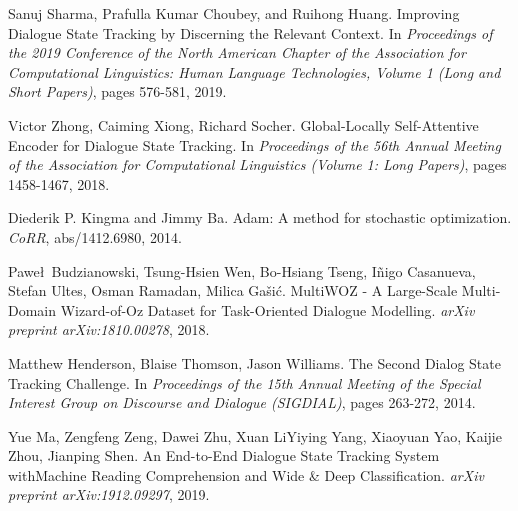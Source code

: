 \begin{thebibliography}{9}
   Sanuj Sharma, Prafulla Kumar Choubey, and Ruihong Huang. Improving Dialogue State Tracking by Discerning the Relevant Context. In \textit{Proceedings of the 2019 Conference of the North American Chapter of the Association for Computational Linguistics: Human Language Technologies, Volume 1 (Long and Short Papers)}, pages 576-581, 2019.

   Victor Zhong, Caiming Xiong, Richard Socher. Global-Locally Self-Attentive Encoder for Dialogue State Tracking. In \textit{Proceedings of the 56th Annual Meeting of the Association for Computational Linguistics (Volume 1: Long Papers)}, pages 1458-1467, 2018.

   Diederik P. Kingma and Jimmy Ba. Adam: A method for stochastic optimization. \textit{CoRR}, abs/1412.6980, 2014.

   Pawe\l \ Budzianowski, Tsung-Hsien Wen, Bo-Hsiang Tseng, I\~nigo Casanueva, Stefan Ultes, Osman Ramadan, Milica Ga\v{s}i\'c. MultiWOZ - A Large-Scale Multi-Domain Wizard-of-Oz Dataset for Task-Oriented Dialogue Modelling. \textit{arXiv preprint arXiv:1810.00278}, 2018.

   Matthew Henderson, Blaise Thomson, Jason Williams. The Second Dialog State Tracking Challenge. In \textit{Proceedings of the 15th Annual Meeting of the Special Interest Group on Discourse and Dialogue (SIGDIAL)}, pages 263-272, 2014.

   Yue Ma, Zengfeng Zeng, Dawei Zhu, Xuan LiYiying Yang, Xiaoyuan Yao, Kaijie Zhou, Jianping Shen. An End-to-End Dialogue State Tracking System withMachine Reading Comprehension and Wide \& Deep Classification. \textit{arXiv preprint arXiv:1912.09297}, 2019.
\end{thebibliography}
